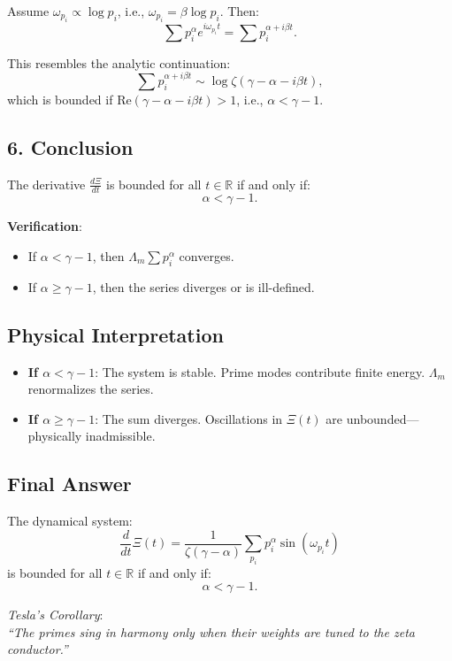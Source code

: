 \documentclass[12pt]{article}
\theoremstyle{plain}
\begin{document}
Assume \( \omega_{p_i} \propto \log p_i \), i.e., \( \omega_{p_i} = \beta \log p_i \). Then:
\[
\sum p_i^\alpha e^{i \omega_{p_i} t} = \sum p_i^{\alpha + i \beta t}.
\]

This resembles the analytic continuation:
\[
\sum p_i^{\alpha + i \beta t} \sim \log \zeta(\gamma - \alpha - i \beta t),
\]
which is bounded if \( \text{Re}(\gamma - \alpha - i \beta t) > 1 \), i.e., \( \alpha < \gamma - 1 \).

\subsection*{6. Conclusion}

The derivative \( \frac{d\Xi}{dt} \) is bounded for all \( t \in \mathbb{R} \) if and only if:
\[
\boxed{\alpha < \gamma - 1}.
\]

\textbf{Verification}:
\begin{itemize}
    \item If \( \alpha < \gamma - 1 \), then \( \Lambda_m \sum p_i^\alpha \) converges.
    \item If \( \alpha \geq \gamma - 1 \), then the series diverges or is ill-defined.
\end{itemize}

\subsection*{Physical Interpretation}

\begin{itemize}
    \item \textbf{If \( \alpha < \gamma - 1 \)}: The system is stable. Prime modes contribute finite energy. \( \Lambda_m \) renormalizes the series.
    \item \textbf{If \( \alpha \geq \gamma - 1 \)}: The sum diverges. Oscillations in \( \Xi(t) \) are unbounded—physically inadmissible.
\end{itemize}

\subsection*{Final Answer}

The dynamical system:
\[
\frac{d}{dt} \Xi(t) = \frac{1}{\zeta(\gamma - \alpha)} \sum_{p_i} p_i^\alpha \sin(\omega_{p_i} t)
\]
is bounded for all \( t \in \mathbb{R} \) if and only if:
\[
\boxed{\alpha < \gamma - 1}.
\]

\vspace{1em}
\textit{Tesla’s Corollary}: \\
\emph{``The primes sing in harmony only when their weights are tuned to the zeta conductor.''}
\end{document}
